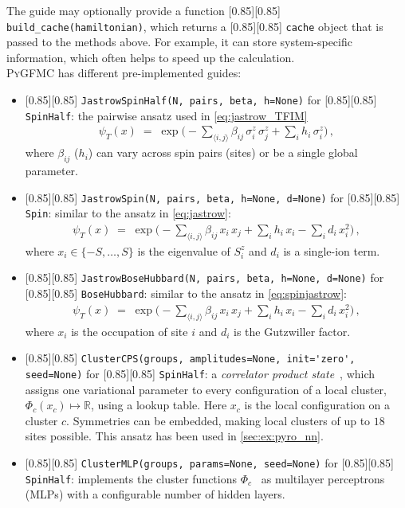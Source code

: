 \documentclass{SciPost}
\newcommand{\pyinline}[1]{\begingroup\setlength{\fboxsep}{0pt}%
  \colorbox{gray!15}{\raisebox{0pt}[0.85\ht\strutbox][0.85\dp\strutbox]{%
    \hspace{1pt}\lstinline{#1}\hspace{1pt}}}\endgroup}
\providecommand{\PyGFMC}{\textsc{PyGFMC}}
\begin{document}
The guide may optionally provide a function \pyinline{build_cache(hamiltonian)}, which returns a \pyinline{cache} object that is passed to the methods above.
%
For example, it can store system-specific information, which often helps to speed up the calculation.\\


\PyGFMC{} has different pre-implemented guides: 
\begin{itemize}
	\item \pyinline{JastrowSpinHalf(N, pairs, beta, h=None)} for \pyinline{SpinHalf}: the pairwise ansatz used in \autoref{eq:jastrow_TFIM}
		\begin{align}
			\psi_T(x) \;=\; \exp\!\Big(
				-\sum_{\langle i,j\rangle} \beta_{ij}\, \sigma^z_i\, \sigma^z_j
				+\sum_i h_i\, \sigma^z_i
			\Big)\,,
			\label{eq:jastrow}
		\end{align}
		where $\beta_{ij}$ ($h_i$) can vary across spin pairs (sites) or be a single global parameter.
	\item \pyinline{JastrowSpin(N, pairs, beta, h=None, d=None)} for \pyinline{Spin}: similar to the ansatz in \autoref{eq:jastrow}:
		\begin{align}
			\psi_T(x) \;=\; \exp\!\Big(
				-\sum_{\langle i,j\rangle} \beta_{ij}\, x_i\, x_j
				+\sum_i h_i\, x_i
				-\sum_i d_i\, x_i^2
			\Big)\,,
			\label{eq:spinjastrow}
		\end{align}
		where $x_i \in \{-S,\dots,S\}$ is the eigenvalue of $S^z_i$ and $d_i$ is a single-ion term.
	\item \pyinline{JastrowBoseHubbard(N, pairs, beta, h=None, d=None)} for \pyinline{BoseHubbard}: similar to the ansatz in \autoref{eq:spinjastrow}:
		\begin{align}
			\psi_T(x) \;=\; \exp\!\Big(
				-\sum_{\langle i,j\rangle} \beta_{ij}\, x_i\, x_j
				+\sum_i h_i\, x_i
				-\sum_i d_i\, x_i^2
			\Big)\,,
			\label{eq:bosonjastrow}
		\end{align}
		where $x_i$ is the occupation of site $i$ and $d_i$ is the Gutzwiller factor.


	\item \pyinline{ClusterCPS(groups, amplitudes=None, init='zero', seed=None)} for \pyinline{SpinHalf}: a \emph{correlator product state}~\cite{changlani_approximating_2009,mezzacapo_ground-state_2009}, which assigns one variational parameter to every configuration of a local cluster, $\Phi_c(x_c) \mapsto \mathbb{R}$, using a lookup table.
		Here $x_c$ is the local configuration on a cluster $c$.
		Symmetries can be embedded, making local clusters of up to $18$ sites possible.
		This ansatz has been used in \autoref{sec:ex:pyro_nn}.
	\item \pyinline{ClusterMLP(groups, params=None, seed=None)} for \pyinline{SpinHalf}: implements the cluster functions $\Phi_c$~\cite{changlani_approximating_2009,mezzacapo_ground-state_2009} as multilayer perceptrons (MLPs) with a configurable number of hidden layers.

\end{itemize}
\end{document}
